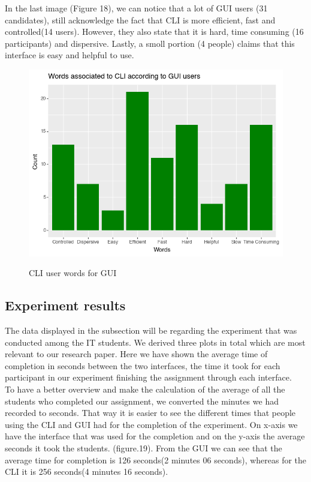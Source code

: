 \documentclass[]{report}
\begin{document}
	In the last image (Figure 18), we can notice that a lot of GUI users (31 candidates), still acknowledge the fact that CLI is more efficient, fast and controlled(14 users). However, they also state that it is hard, time consuming (16 participants) and dispersive. Lastly, a smoll portion (4 people) claims that this interface is easy and helpful to use.
	
	
	\begin{figure}[H]
		\centering
		\includegraphics[width=0.75\linewidth]{WordsCLIFromGUI}\\
		\caption{CLI user words for GUI}
		\label{fig: 18}
	\end{figure}
\newpage

\subsection{Experiment results}
The data displayed in the subsection will be regarding the experiment that was conducted among the IT students. We derived three plots in total which are most relevant to our research paper. Here we have shown the average time of completion in seconds between the two interfaces, the time it took for each participant in our experiment finishing the assignment through each interface.\\

		
	To have a better overview and make the calculation of the average of all the students who completed our assignment, we converted the minutes we had recorded to seconds. That way it is easier to see the different times that people using the CLI and GUI had for the completion of the experiment. On x-axis we have the interface that was used for the completion and on the y-axis the average seconds it took the students. (figure.19). From the GUI we can see that the average time for completion is 126 seconds(2 minutes 06 seconds), whereas for the CLI it is 256 seconds(4 minutes 16 seconds).
\end{document}
